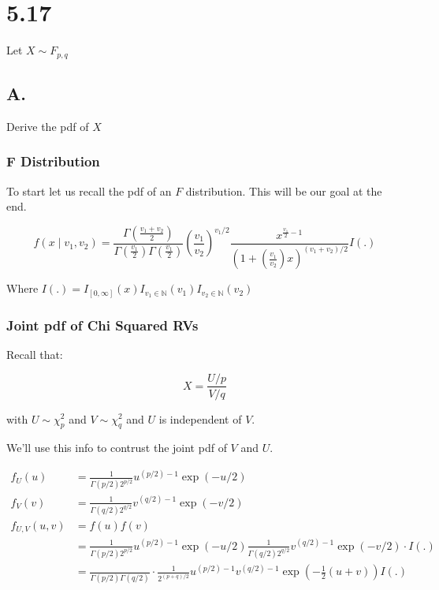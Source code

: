 \section*{5.17}

Let $X \sim F_{p,q}$

\subsection*{A.}

Derive the  pdf of $X$

\subsubsection*{F Distribution}

To start let us recall the pdf of an $F$ distribution. This will be our goal at the end.

\[
f(x \mid v_1, v_2) = 
\frac{\Gamma(\frac{v_1 + v_2}{2})}{\Gamma(\frac{v_1}{2})\Gamma(\frac{v_1}{2})}
\left(\frac{v_1}{v_2}\right)^{v_1/2}
\frac{x^{\frac{v_1}{2} - 1}}{\left( 1 + \left( \frac{v_1}{v_2} \right)x \right)^{(v_1 + v_2)/2}}
I(.)
\]

Where $I(.) = I_{[0, \infty]}(x)I_{v_1 \in \mathbb{N}}(v_1)I_{v_2 \in \mathbb{N}}(v_2)$

\subsubsection*{Joint pdf of Chi Squared RVs}

Recall that:

\[X = \frac{U/p}{V/q}\]

with $U\sim \chi^2_p$ and $V \sim \chi^2_q$ and $U$ is independent of $V$.

We'll use this info to contrust the joint pdf of $V$ and $U$.

\begin{align*}
	f_U(u) &= \frac{1}{\Gamma(p/2) 2^{p/2}} u^{(p/2)-1} \exp(-u/2) \\
	f_V(v) &= \frac{1}{\Gamma(q/2) 2^{q/2}} v^{(q/2)-1} \exp(-v/2) \\
	f_{U,V}(u,v) &= f(u) f(v) \\ 
	&= \frac{1}{\Gamma(p/2) 2^{p/2}} u^{(p/2)-1} \exp(-u/2) \frac{1}{\Gamma(q/2) 2^{q/2}} v^{(q/2)-1} \exp(-v/2) \cdot I(.) \\
	&= \frac{}{\Gamma(p/2) \Gamma(q/2)} \cdot \frac{1}{2^{(p+q)/2}} u^{(p/2)-1} v^{(q/2)-1} \exp\left( -\frac{1}{2}(u+v) \right) I(.)
\end{align*}

